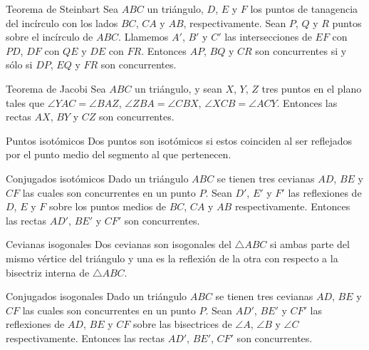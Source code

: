 \begin{section-theorem.tcb}{Teorema de Steinbart}{}
    Sea $ABC$ un triángulo, $D$, $E$ y $F$ los puntos de tanagencia del incírculo con los lados $BC$, $CA$ y $AB$, respectivamente.
    Sean $P$, $Q$ y $R$ puntos sobre el incírculo de $ABC$.
    Llamemos $A'$, $B'$ y $C'$ las intersecciones de $EF$ con $PD$, $DF$ con $QE$ y $DE$ con $FR$.
    Entonces $AP$, $BQ$ y $CR$ son concurrentes si y sólo si $DP$, $EQ$ y $FR$ son concurrentes.
\end{section-theorem.tcb}

\begin{section-theorem.tcb}{Teorema de Jacobi}{}
    Sea $ABC$ un triángulo, y sean $X$, $Y$, $Z$ tres puntos en el plano tales que $\angle YAC = \angle BAZ$, $\angle ZBA = \angle CBX$, $\angle XCB = \angle ACY$.
    Entonces las rectas $AX$, $BY$ y $CZ$ son concurrentes.
\end{section-theorem.tcb}

\begin{section-definition.tcb}{Puntos isotómicos}{}
    Dos puntos son isotómicos si estos coinciden al ser reflejados por el punto medio del segmento al que pertenecen.
\end{section-definition.tcb}

\begin{section-definition.tcb}{Conjugados isotómicos}{}
    Dado un triángulo $ABC$ se tienen tres cevianas $AD$, $BE$ y $CF$ las cuales son concurrentes en un punto $P$.
    Sean $D'$, $E'$ y $F'$ las reflexiones de $D$, $E$ y $F$ sobre los puntos medios de $BC$, $CA$ y $AB$ respectivamente.
    Entonces las rectas $AD'$, $BE'$ y $CF'$ son concurrentes.
\end{section-definition.tcb}

\begin{section-definition.tcb}{Cevianas isogonales}{}
    Dos cevianas son isogonales del $\triangle ABC$ si ambas parte del mismo vértice del triángulo y una es la reflexión de la otra con respecto a la bisectriz interna de $\triangle ABC$.
\end{section-definition.tcb}

\begin{section-definition.tcb}{Conjugados isogonales}{}
    Dado un triángulo $ABC$ se tienen tres cevianas $AD$, $BE$ y $CF$ las cuales son concurrentes en un punto $P$.
    Sean $AD'$, $BE'$ y $CF'$ las reflexiones de $AD$, $BE$ y $CF$ sobre las bisectrices de $\angle A$, $\angle B$ y $\angle C$ respectivamente.
    Entonces las rectas $AD'$, $BE'$, $CF'$ son concurrentes.
\end{section-definition.tcb}


